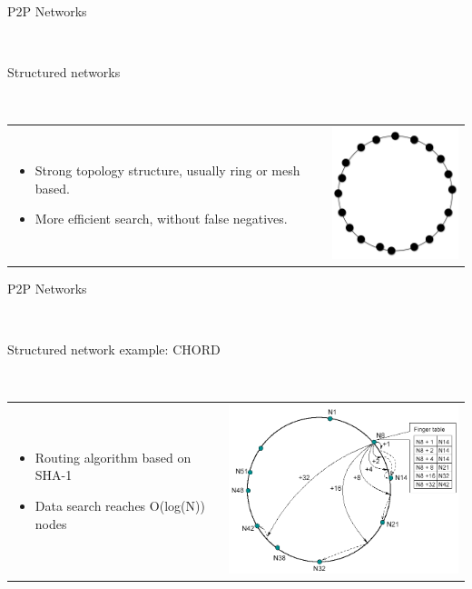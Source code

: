 \documentclass[12pt]{beamer}
\renewcommand{\frametitle}[1]{\vspace{0.2cm}\begin{huge}#1\end{huge}\\}
\renewcommand{\framesubtitle}[1]{\vspace{0.4cm} \hspace{0.4cm}\begin{large}#1\end{large}\\}
\begin{document}
    \begin{frame}
    \frametitle{P2P Networks}
    \framesubtitle{Structured networks}
    \begin{table}
    \begin{tabular}{p{7cm}p{3cm}}
    \begin{itemize}
        \item Strong topology structure, usually ring or mesh based.
        \item More efficient search, without false negatives.
    \end{itemize}
    &
    \vspace{1.5cm}
    \includegraphics[width=4cm]{../../presentacion/img/p2p-structured}\\
    \end{tabular}
    \end{table}
    \end{frame}

    \begin{frame}
    \frametitle{P2P Networks}
    \framesubtitle{Structured network example: CHORD}
    \begin{table}
    \begin{tabular}{p{3cm}p{7cm}}
    \begin{itemize}
        \item Routing algorithm based on SHA-1
        \item Data search reaches O(log(N)) nodes
    \end{itemize}
    &
    \vspace{0.5cm}
    \includegraphics[width=8cm]{../../presentacion/img/chord-search}\\
    \end{tabular}
    \end{table}
    \end{frame}
\end{document}
